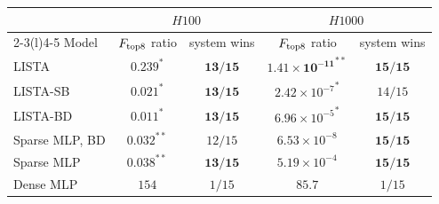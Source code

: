 \begin{tabular}{@{}l cc cc@{}}
\toprule
& \multicolumn{2}{c}{$H100$} & \multicolumn{2}{c}{$H1000$} \\
\cmidrule(lr){2-3}\cmidrule(l){4-5}
Model & \(F_{\rm top8}\) ratio & system wins & \(F_{\rm top8}\) ratio & system wins \\
\midrule
LISTA & ${0.239}^{\ast}$ & $\mathbf{13/15}$ & ${\mathbf{1.41\times10^{-11}}}^{\ast\ast}$ & $\mathbf{15/15}$ \\
LISTA-SB & ${0.021}^{\ast}$ & $\mathbf{13/15}$ & ${2.42\times10^{-7}}^{\ast}$ & $14/15$ \\
LISTA-BD & ${\mathbf{0.011}}^{\ast}$ & $\mathbf{13/15}$ & ${6.96\times10^{-5}}^{\ast}$ & $\mathbf{15/15}$ \\
Sparse MLP, BD & ${0.032}^{\ast\ast}$ & $12/15$ & ${6.53\times10^{-8}}$ & $\mathbf{15/15}$ \\
Sparse MLP & ${0.038}^{\ast\ast}$ & $\mathbf{13/15}$ & ${5.19\times10^{-4}}$ & $\mathbf{15/15}$ \\
Dense MLP & ${154}$ & $1/15$ & ${85.7}$ & $1/15$ \\
\bottomrule
\end{tabular}
